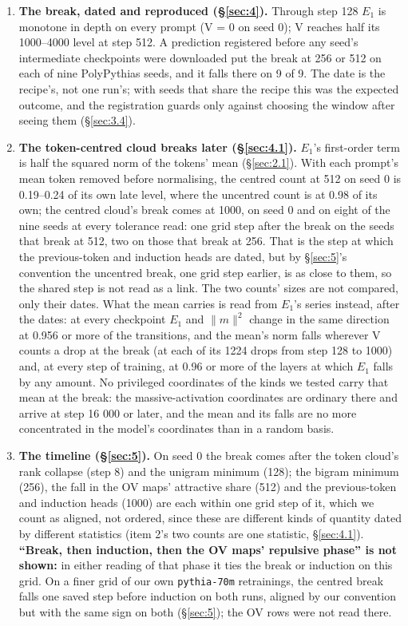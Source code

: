 \documentclass[11pt]{article}
\begin{document}
\begin{enumerate}
  \item \textbf{The break, dated and reproduced (\S\ref{sec:4}).} Through step 128 $E_{1}$ is monotone in depth on every prompt (V = 0 on seed 0); V reaches half its 1000--4000 level at step 512. A prediction registered before any seed's intermediate checkpoints were downloaded put the break at 256 or 512 on each of nine PolyPythias seeds, and it falls there on 9 of 9. The date is the recipe's, not one run's; with seeds that share the recipe this was the expected outcome, and the registration guards only against choosing the window after seeing them (\S\ref{sec:3.4}).
  \item \textbf{The token-centred cloud breaks later (\S\ref{sec:4.1}).} $E_{1}$'s first-order term is half the squared norm of the tokens' mean (\S\ref{sec:2.1}). With each prompt's mean token removed before normalising, the centred count at 512 on seed 0 is 0.19--0.24 of its own late level, where the uncentred count is at 0.98 of its own; the centred cloud's break comes at 1000, on seed 0 and on eight of the nine seeds at every tolerance read: one grid step after the break on the seeds that break at 512, two on those that break at 256. That is the step at which the previous-token and induction heads are dated, but by \S\ref{sec:5}'s convention the uncentred break, one grid step earlier, is as close to them, so the shared step is not read as a link. The two counts' sizes are not compared, only their dates. What the mean carries is read from $E_{1}$'s series instead, after the dates: at every checkpoint $E_{1}$ and $\|m\|^{2}$ change in the same direction at 0.956 or more of the transitions, and the mean's norm falls wherever V counts a drop at the break (at each of its 1224 drops from step 128 to 1000) and, at every step of training, at 0.96 or more of the layers at which $E_{1}$ falls by any amount. No privileged coordinates of the kinds we tested carry that mean at the break: the massive-activation coordinates are ordinary there and arrive at step 16 000 or later, and the mean and its falls are no more concentrated in the model's coordinates than in a random basis.
  \item \textbf{The timeline (\S\ref{sec:5}).} On seed 0 the break comes after the token cloud's rank collapse (step 8) and the unigram minimum (128); the bigram minimum (256), the fall in the OV maps' attractive share (512) and the previous-token and induction heads (1000) are each within one grid step of it, which we count as aligned, not ordered, since these are different kinds of quantity dated by different statistics (item 2's two counts are one statistic, \S\ref{sec:4.1}). \textbf{``Break, then induction, then the OV maps' repulsive phase'' is not shown:} in either reading of that phase it ties the break or induction on this grid. On a finer grid of our own \texttt{pythia-70m} retrainings, the centred break falls one saved step before induction on both runs, aligned by our convention but with the same sign on both (\S\ref{sec:5}); the OV rows were not read there.

\end{enumerate}
\end{document}
